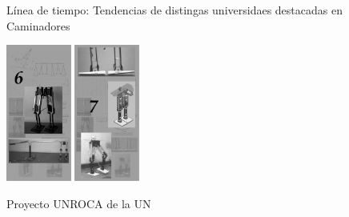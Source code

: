 {{\begin{marginfigure}[-10.0cm]
      \caption{L\'inea de tiempo: Tendencias de distingas universidaes destacadas en Caminadores}
      \label{fig:timelineH}
    \end{marginfigure}
    \begin{marginfigure}[-2.0cm]
      \centering
      \includegraphics[height=4.5cm]{../images/UNROCA_5.png}
      \includegraphics[height=4.5cm]{../images/UNROCA_6.png}
      \caption{Proyecto UNROCA de la UN}
      \label{fig:rocaUN}
    \end{marginfigure}
  }
}
